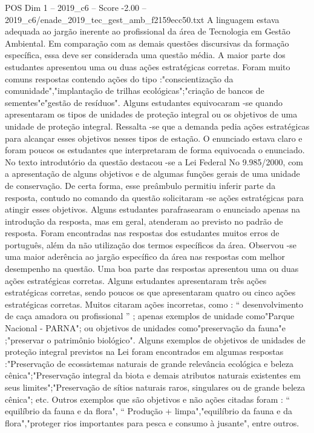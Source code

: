 \begin{textsample}{POS Dim 1 – 2019\_c6 – Score -2.00 – 2019\_c6/enade\_2019\_tec\_gest\_amb\_f2159ecc50.txt}
A linguagem estava adequada ao jargão inerente ao profissional da área de Tecnologia em Gestão Ambiental.
Em comparação com as demais questões discursivas da formação específica, essa deve ser considerada uma questão média.
A maior parte dos estudantes apresentou uma ou duas ações estratégicas corretas.
Foram muito comuns respostas contendo ações do tipo :"conscientização da comunidade","implantação de trilhas ecológicas";"criação de bancos de sementes"e"gestão de resíduos".
Alguns estudantes equivocaram -se quando apresentaram os tipos de unidades de proteção integral ou os objetivos de uma unidade de proteção integral.
Ressalta -se que a demanda pedia ações estratégicas para alcançar esses objetivos nesses tipos de estação.
O enunciado estava claro e foram poucos os estudantes que interpretaram de forma equivocada o enunciado.
No texto introdutório da questão destacou -se a Lei Federal No 9.985/2000, com a apresentação de alguns objetivos e de algumas funções gerais de uma unidade de conservação.
De certa forma, esse preâmbulo permitiu inferir parte da resposta, contudo no comando da questão solicitaram -se ações estratégicas para atingir esses objetivos.
Alguns estudantes parafrasearam o enunciado apenas na introdução da resposta, mas em geral, atenderam ao previsto no padrão de resposta.
Foram encontradas nas respostas dos estudantes muitos erros de português, além da não utilização dos termos específicos da área.
Observou -se uma maior aderência ao jargão específico da área nas respostas com melhor desempenho na questão.
Uma boa parte das respostas apresentou uma ou duas ações estratégicas corretas.
Alguns estudantes apresentaram três ações estratégicas corretas, sendo poucos os que apresentaram quatro ou cinco ações estratégicas corretas.
Muitos citaram ações incorretas, como : “ desenvolvimento de caça amadora ou profissional ” ; apenas exemplos de unidade como"Parque Nacional - PARNA"; ou objetivos de unidades como"preservação da fauna"e ;"preservar o patrimônio biológico".
Alguns exemplos de objetivos de unidades de proteção integral previstos na Lei foram encontrados em algumas respostas :"Preservação de ecossistemas naturais de grande relevância ecológica e beleza cênica";"Preservação integral da biota e demais atributos naturais existentes em seus limites";"Preservação de sítios naturais raros, singulares ou de grande beleza cênica"; etc.
Outros exemplos que são objetivos e não ações citadas foram : “ equilíbrio da fauna e da flora", “ Produção + limpa","equilíbrio da fauna e da flora","proteger rios importantes para pesca e consumo à jusante", entre outros.

\end{textsample}
